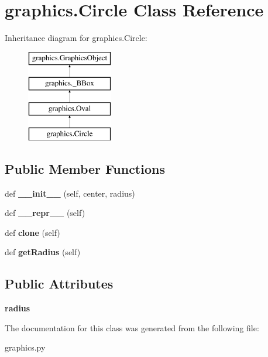 \hypertarget{classgraphics_1_1_circle}{}\section{graphics.\+Circle Class Reference}
\label{classgraphics_1_1_circle}
Inheritance diagram for graphics.\+Circle\+:\begin{figure}[H]
\begin{center}
\leavevmode
\includegraphics[height=4.000000cm]{classgraphics_1_1_circle}
\end{center}
\end{figure}
\subsection*{Public Member Functions}
\begin{DoxyCompactItemize}
\item 
\mbox{\label{classgraphics_1_1_circle_adf9ab62e2d952cf52cfecba9acfd5660}} 
def {\bfseries \+\_\+\+\_\+init\+\_\+\+\_\+} (self, center, radius)
\item 
\mbox{\label{classgraphics_1_1_circle_a7acb1acc63613799ff2724cb05d75750}} 
def {\bfseries \+\_\+\+\_\+repr\+\_\+\+\_\+} (self)
\item 
\mbox{\label{classgraphics_1_1_circle_ae575b71c63ce889e4c872c792d748f7b}} 
def {\bfseries clone} (self)
\item 
\mbox{\label{classgraphics_1_1_circle_a420b2e69c4d116c094dc6bd6b1e81839}} 
def {\bfseries get\+Radius} (self)
\end{DoxyCompactItemize}
\subsection*{Public Attributes}
\begin{DoxyCompactItemize}
\item 
\mbox{\label{classgraphics_1_1_circle_aacc54bd0a94edd646405c8718cbeb47c}} 
{\bfseries radius}
\end{DoxyCompactItemize}


The documentation for this class was generated from the following file\+:\begin{DoxyCompactItemize}
\item 
graphics.\+py\end{DoxyCompactItemize}

